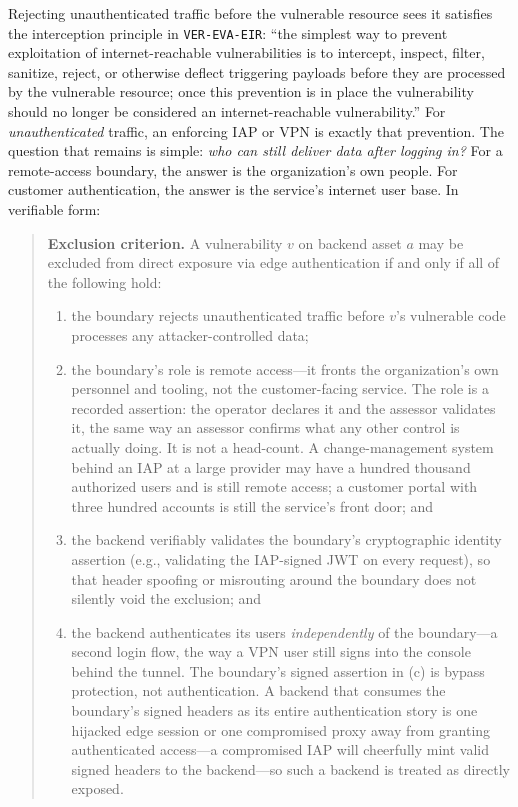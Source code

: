 \documentclass[11pt]{article}
\newcommand{\code}[1]{\texttt{#1}}
\begin{document}
Rejecting unauthenticated traffic before the vulnerable resource sees it satisfies the interception principle in \code{VER-EVA-EIR}: ``the simplest way to prevent exploitation of internet-reachable vulnerabilities is to intercept, inspect, filter, sanitize, reject, or otherwise deflect triggering payloads before they are processed by the vulnerable resource; once this prevention is in place the vulnerability should no longer be considered an internet-reachable vulnerability.'' For \emph{unauthenticated} traffic, an enforcing IAP or VPN is exactly that prevention. The question that remains is simple: \emph{who can still deliver data after logging in?} For a remote-access boundary, the answer is the organization's own people. For customer authentication, the answer is the service's internet user base. In verifiable form:

\begin{quote}
\textbf{Exclusion criterion.} A vulnerability $v$ on backend asset $a$ may be excluded from direct exposure via edge authentication if and only if all of the following hold:
\begin{enumerate}[label=(\alph*), leftmargin=2.5em, nosep]
\item the boundary rejects unauthenticated traffic before $v$'s vulnerable code processes any attacker-controlled data;
\item the boundary's role is remote access---it fronts the organization's own personnel and tooling, not the customer-facing service. The role is a recorded assertion: the operator declares it and the assessor validates it, the same way an assessor confirms what any other control is actually doing. It is not a head-count. A change-management system behind an IAP at a large provider may have a hundred thousand authorized users and is still remote access; a customer portal with three hundred accounts is still the service's front door; and
\item the backend verifiably validates the boundary's cryptographic identity assertion (e.g., validating the IAP-signed JWT on every request), so that header spoofing or misrouting around the boundary does not silently void the exclusion; and
\item the backend authenticates its users \emph{independently} of the boundary---a second login flow, the way a VPN user still signs into the console behind the tunnel. The boundary's signed assertion in (c) is bypass protection, not authentication. A backend that consumes the boundary's signed headers as its entire authentication story is one hijacked edge session or one compromised proxy away from granting authenticated access---a compromised IAP will cheerfully mint valid signed headers to the backend---so such a backend is treated as directly exposed.
\end{enumerate}
\end{quote}
\end{document}
